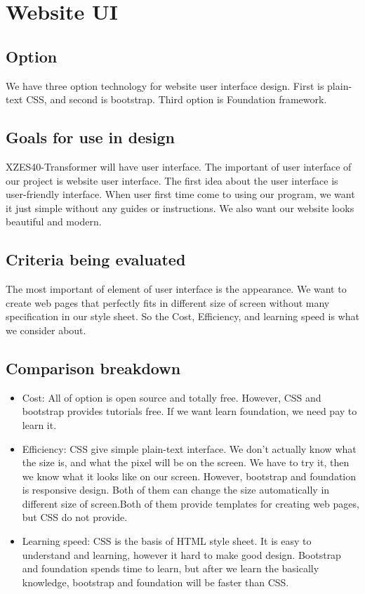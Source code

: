 \section{Website UI}

\subsection{Option}
We have three option technology for website user interface design. 
First is plain-text CSS, and second is bootstrap. Third option is Foundation framework.

\subsection{Goals for use in design}
XZES40-Transformer will have user interface. The important of user interface of our project is website user interface.
The first idea about the user interface is user-friendly interface. When user first time come to using our program, we want it just simple without any guides or instructions. We also want our website looks beautiful and modern. 

\subsection{Criteria being evaluated}
The most important of element of user interface is the appearance. We want to create web pages that perfectly fits in different size of screen without many specification in our style sheet. So the Cost, Efficiency, and learning speed is what we consider about.

\subsection{Comparison breakdown}
    \begin{itemize}
      \item Cost: All of option is open source and totally free. However, CSS and bootstrap provides tutorials free. If we want learn foundation, we need pay to learn it.
      \item Efficiency: CSS give simple plain-text interface. We don't actually know what the size is, and what the pixel will be on the screen. We have to try it, then we know what it looks like on our screen. However, bootstrap and foundation is responsive design. Both of them can change the size automatically in different size of screen.Both of them provide templates for creating web pages, but CSS do not provide.
      \item Learning speed: CSS is the basis of HTML style sheet. It is easy to understand and learning, however it hard to make good design. Bootstrap and foundation spends time to learn, but after we learn the basically knowledge, bootstrap and foundation will be faster than CSS.
    \end{itemize}

